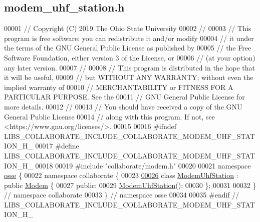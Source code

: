 \hypertarget{modem__uhf__station_8h_source}{}\subsection{modem\+\_\+uhf\+\_\+station.\+h}
\label{modem__uhf__station_8h_source}

\begin{DoxyCode}
00001 \textcolor{comment}{// Copyright (C) 2019 The Ohio State University}
00002 \textcolor{comment}{//}
00003 \textcolor{comment}{// This program is free software: you can redistribute it and/or modify}
00004 \textcolor{comment}{// it under the terms of the GNU General Public License as published by}
00005 \textcolor{comment}{// the Free Software Foundation, either version 3 of the License, or}
00006 \textcolor{comment}{// (at your option) any later version.}
00007 \textcolor{comment}{//}
00008 \textcolor{comment}{// This program is distributed in the hope that it will be useful,}
00009 \textcolor{comment}{// but WITHOUT ANY WARRANTY; without even the implied warranty of}
00010 \textcolor{comment}{// MERCHANTABILITY or FITNESS FOR A PARTICULAR PURPOSE.  See the}
00011 \textcolor{comment}{// GNU General Public License for more details.}
00012 \textcolor{comment}{//}
00013 \textcolor{comment}{// You should have received a copy of the GNU General Public License}
00014 \textcolor{comment}{// along with this program.  If not, see <https://www.gnu.org/licenses/>.}
00015 
00016 \textcolor{preprocessor}{#ifndef LIBS\_COLLABORATE\_INCLUDE\_COLLABORATE\_MODEM\_UHF\_STATION\_H\_}
00017 \textcolor{preprocessor}{#define LIBS\_COLLABORATE\_INCLUDE\_COLLABORATE\_MODEM\_UHF\_STATION\_H\_}
00018 
00019 \textcolor{preprocessor}{#include "collaborate/modem.h"}
00020 
00021 \textcolor{keyword}{namespace }\hyperlink{namespaceosse}{osse} \{
00022 \textcolor{keyword}{namespace }collaborate \{
00023 
\hyperlink{classosse_1_1collaborate_1_1_modem_uhf_station}{00026} \textcolor{keyword}{class }\hyperlink{classosse_1_1collaborate_1_1_modem_uhf_station}{ModemUhfStation} : \textcolor{keyword}{public} \hyperlink{classosse_1_1collaborate_1_1_modem}{Modem} \{
00027  \textcolor{keyword}{public}:
00029   \hyperlink{classosse_1_1collaborate_1_1_modem_uhf_station_a26cc4da6ecf733547178400fbfaac340}{ModemUhfStation}();
00030 \};
00031 
00032 \}  \textcolor{comment}{// namespace collaborate}
00033 \}  \textcolor{comment}{// namespace osse}
00034 
00035 \textcolor{preprocessor}{#endif  // LIBS\_COLLABORATE\_INCLUDE\_COLLABORATE\_MODEM\_UHF\_STATION\_H\_}
\end{DoxyCode}

